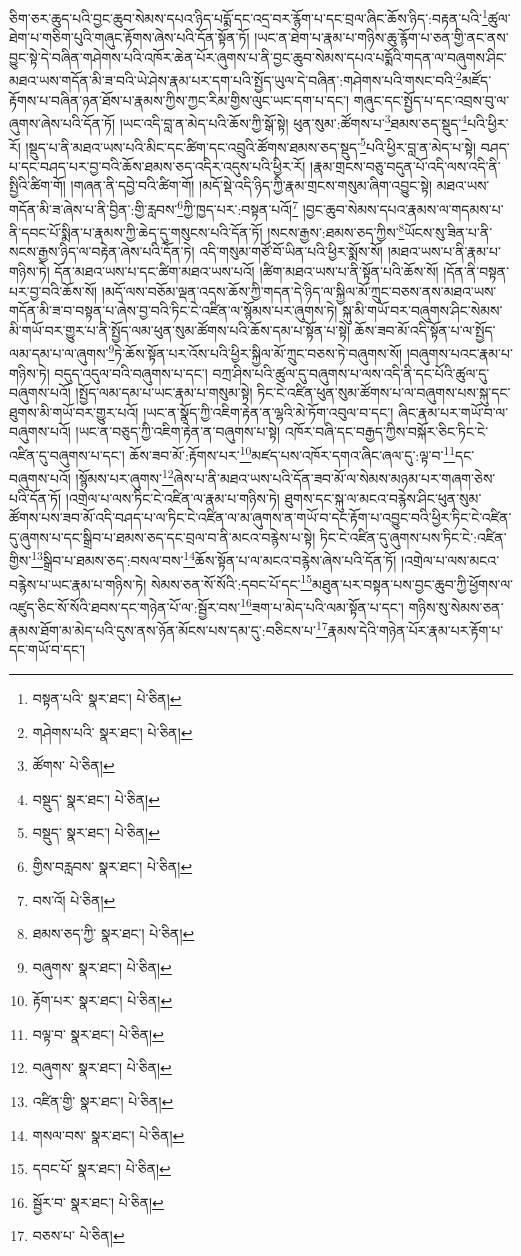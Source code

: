 ཅིག་ཅར་ཆུད་པའི་བྱང་ཆུབ་སེམས་དཔའ་ཉིད་པདྨོ་དང་འདྲ་བར་རྙོག་པ་དང་བྲལ་ཞིང་ཆོས་ཉིད་:བརྟན་པའི་\footnote{བསྟན་པའི་  སྣར་ཐང་།  པེ་ཅིན། }ཚུལ་ཐེག་པ་གཅིག་པུའི་གཞུང་རྟོགས་ཞེས་པའི་དོན་སྟོན་ཏོ། །ཡང་ན་ཐེག་པ་རྣམ་པ་གཉིས་ཆུ་རྙོག་པ་ཅན་གྱི་ནང་ནས་བྱུང་སྟེ་དེ་བཞིན་གཤེགས་པའི་འཁོར་ཆེན་པོར་ཞུགས་པ་ནི་བྱང་ཆུབ་སེམས་དཔའ་པདྨོའི་གདན་ལ་བཞུགས་ཤིང་མཐའ་ཡས་གདོན་མི་ཟ་བའི་ཡེ་ཤེས་རྣམ་པར་དག་པའི་སྤྱོད་ཡུལ་དེ་བཞིན་:གཤེགས་པའི་གསང་བའི་\footnote{གཤེགས་པའི་  སྣར་ཐང་།  པེ་ཅིན། }མཛོད་རྟོགས་པ་བཞིན་ཉན་ཐོས་པ་རྣམས་ཀྱིས་ཀྱང་རིམ་གྱིས་ལུང་ཡང་དག་པ་དང་། གཞུང་དང་སྤྱོད་པ་དང་འབྲས་བུ་ལ་ཞུགས་ཞེས་པའི་དོན་ཏོ། །ཡང་འདི་བླ་ན་མེད་པའི་ཆོས་ཀྱི་སྒོ་སྟེ། ཕུན་སུམ་:ཚོགས་པ་\footnote{ཚོགས་  པེ་ཅིན། }ཐམས་ཅད་སྡུད་\footnote{བསྡུད་  སྣར་ཐང་།  པེ་ཅིན། }པའི་ཕྱིར་རོ། །སྡུད་པ་ནི་མཐའ་ཡས་པའི་མིང་དང་ཚིག་དང་འབྲུའི་ཚོགས་ཐམས་ཅད་སྡུད་\footnote{བསྡུད་  སྣར་ཐང་།  པེ་ཅིན། }པའི་ཕྱིར་བླ་ན་མེད་པ་སྟེ། བཤད་པ་དང་བཤད་པར་བྱ་བའི་ཆོས་ཐམས་ཅད་འདིར་འདུས་པའི་ཕྱིར་རོ། །རྣམ་གྲངས་བཅུ་བདུན་པོ་འདི་ལས་འདི་ནི་སྤྱིའི་ཚིག་གོ། །གཞན་ནི་དབྱེ་བའི་ཚིག་གོ། །མདོ་སྡེ་འདི་ཉིད་ཀྱི་རྣམ་གྲངས་གསུམ་ཞིག་འབྱུང་སྟེ། མཐའ་ཡས་གདོན་མི་ཟ་ཞེས་པ་ནི་བྱིན་:གྱི་རླབས་\footnote{གྱིས་བརླབས་  སྣར་ཐང་།  པེ་ཅིན། }ཀྱི་ཁྱད་པར་:བསྟན་པའོ།\footnote{བས་འོ།  པེ་ཅིན། } །བྱང་ཆུབ་སེམས་དཔའ་རྣམས་ལ་གདམས་པ་ནི་དབང་པོ་སྨིན་པ་རྣམས་ཀྱི་ཆེད་དུ་གསུངས་པའི་དོན་ཏོ། །སངས་རྒྱས་:ཐམས་ཅད་ཀྱིས་\footnote{ཐམས་ཅད་ཀྱི་  སྣར་ཐང་།  པེ་ཅིན། }ཡོངས་སུ་ཟིན་པ་ནི་སངས་རྒྱས་ཉིད་ལ་བརྟེན་ཞེས་པའི་དོན་ཏེ། འདི་གསུམ་གཙོ་བོ་ཡིན་པའི་ཕྱིར་སྨོས་སོ། །མཐའ་ཡས་པ་ནི་རྣམ་པ་གཉིས་ཏེ། དོན་མཐའ་ཡས་པ་དང་ཚིག་མཐའ་ཡས་པའོ། །ཚིག་མཐའ་ཡས་པ་ནི་སྟོན་པའི་ཆོས་སོ། །དོན་ནི་བསྟན་པར་བྱ་བའི་ཆོས་སོ། །མདོ་ལས་བཅོམ་ལྡན་འདས་ཆོས་ཀྱི་གདན་དེ་ཉིད་ལ་སྐྱིལ་མོ་ཀྲུང་བཅས་ནས་མཐའ་ཡས་གདོན་མི་ཟ་བ་བསྟན་པ་ཞེས་བྱ་བའི་ཏིང་ངེ་འཛིན་ལ་སྙོམས་པར་ཞུགས་ཏེ། སྐུ་མི་གཡོ་བར་བཞུགས་ཤིང་སེམས་མི་གཡོ་བར་གྱུར་པ་ནི་སྤྱོད་ལམ་ཕུན་སུམ་ཚོགས་པའི་ཆོས་དམ་པ་སྟོན་པ་སྟེ། ཆོས་ཟབ་མོ་འདི་སྟོན་པ་ལ་སྤྱོད་ལམ་དམ་པ་ལ་ཞུགས་\footnote{བཞུགས་  སྣར་ཐང་།  པེ་ཅིན། }ཏེ་ཆོས་སྟོན་པར་འོས་པའི་ཕྱིར་སྐྱིལ་མོ་ཀྲུང་བཅས་ཏེ་བཞུགས་སོ། །བཞུགས་པའང་རྣམ་པ་གཉིས་ཏེ། བདུད་འདུལ་བའི་བཞུགས་པ་དང་། བཀྲ་ཤིས་པའི་ཚུལ་དུ་བཞུགས་པ་ལས་འདི་ནི་དང་པོའི་ཚུལ་དུ་བཞུགས་པའོ། །སྤྱོད་ལམ་དམ་པ་ཡང་རྣམ་པ་གསུམ་སྟེ། ཏིང་ངེ་འཛིན་ཕུན་སུམ་ཚོགས་པ་ལ་བཞུགས་པས་སྐུ་དང་ཐུགས་མི་གཡོ་བར་གྱུར་པའོ། །ཡང་ན་སྣོད་ཀྱི་འཇིག་རྟེན་ན་ལྷའི་མེ་ཏོག་འབུལ་བ་དང་། ཞིང་རྣམ་པར་གཡོ་བ་ལ་བཞུགས་པའོ། །ཡང་ན་བཅུད་ཀྱི་འཇིག་རྟེན་ན་བཞུགས་པ་སྟེ། འཁོར་བཞི་དང་བརྒྱད་ཀྱིས་བསྐོར་ཅིང་ཏིང་ངེ་འཛིན་དུ་བཞུགས་པ་དང་། ཆོས་ཟབ་མོ་:རྟོགས་པར་\footnote{རྟོག་པར་  སྣར་ཐང་།  པེ་ཅིན། }མཛད་པས་འཁོར་དགའ་ཞིང་ཞལ་དུ་:ལྟ་བ་\footnote{བལྟ་བ་  སྣར་ཐང་།  པེ་ཅིན། }དང་བཞུགས་པའོ། །སྙོམས་པར་ཞུགས་\footnote{བཞུགས་  སྣར་ཐང་།  པེ་ཅིན། }ཞེས་པ་ནི་མཐའ་ཡས་པའི་དོན་ཟབ་མོ་ལ་སེམས་མཉམ་པར་གཞག་ཅེས་པའི་དོན་ཏོ། །འགྲེལ་པ་ལས་ཏིང་ངེ་འཛིན་ལ་རྣམ་པ་གཉིས་ཏེ། ཐུགས་དང་སྐུ་ལ་མངའ་བརྙེས་ཤིང་ཕུན་སུམ་ཚོགས་པས་ཟབ་མོ་འདི་བཤད་པ་ལ་ཏིང་ངེ་འཛིན་ལ་མ་ཞུགས་ན་གཡོ་བ་དང་རྟོག་པ་འབྱུང་བའི་ཕྱིར་ཏིང་ངེ་འཛིན་དུ་ཞུགས་པ་དང་སྒྲིབ་པ་ཐམས་ཅད་དང་བྲལ་བ་ནི་མངའ་བརྙེས་པ་སྟེ། ཏིང་ངེ་འཛིན་དུ་ཞུགས་པས་ཏིང་ངེ་:འཛིན་གྱིས་\footnote{འཛིན་གྱི་  སྣར་ཐང་།  པེ་ཅིན། }སྒྲིབ་པ་ཐམས་ཅད་:བསལ་བས་\footnote{གསལ་བས་  སྣར་ཐང་།  པེ་ཅིན། }ཆོས་སྟོན་པ་ལ་མངའ་བརྙེས་ཞེས་པའི་དོན་ཏོ། །འགྲེལ་པ་ལས་མངའ་བརྙེས་པ་ཡང་རྣམ་པ་གཉིས་ཏེ། སེམས་ཅན་སོ་སོའི་:དབང་པོ་དང་\footnote{དབང་པོ་  སྣར་ཐང་།  པེ་ཅིན། }མཐུན་པར་བསྟན་པས་བྱང་ཆུབ་ཀྱི་ཕྱོགས་ལ་འཛུད་ཅིང་སོ་སོའི་ཐབས་དང་གཉེན་པོ་ལ་:སྦྱོར་བས་\footnote{སྦྱོར་བ་  སྣར་ཐང་།  པེ་ཅིན། }ཟག་པ་མེད་པའི་ལམ་སྟོན་པ་དང་། གཉིས་སུ་སེམས་ཅན་རྣམས་ཐོག་མ་མེད་པའི་དུས་ནས་ཉོན་མོངས་པས་དམ་དུ་:བཅིངས་པ་\footnote{བཅས་པ་  པེ་ཅིན། }རྣམས་དེའི་གཉེན་པོར་རྣམ་པར་རྟོག་པ་དང་གཡོ་བ་དང་། 
